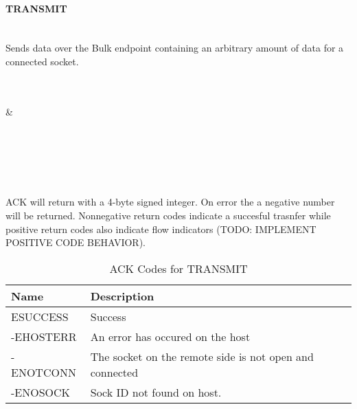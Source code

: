\documentclass[10pt]{article}
\begin{document}
	\paragraph{TRANSMIT} \mbox{}\\
	Sends data over the Bulk endpoint containing an arbitrary amount of data for a connected socket.\\
	\\
	\begin{bytefield}[bitwidth=1.7em]{32}
		 \\
			 &
			 \\
			 \\
			 \\
			 \\
	\end{bytefield}\\
	\\
	ACK will return with a 4-byte signed integer. On error the a negative number will be returned. Nonnegative return codes indicate a succesful trasnfer while positive return codes also indicate flow indicators (TODO: IMPLEMENT POSITIVE CODE BEHAVIOR).\\
	\begin{table}[H]
		\begin{center}
			\caption{ACK Codes for TRANSMIT}
			\label{tab:transmitErrTable}
			\begin{tabular}{l|l} 
				\rowcolor{lightgray}
				\textbf{Name} & \textbf{Description}\\
				\hline
				ESUCCESS & Success\\
				-EHOSTERR & An error has occured on the host\\
				-ENOTCONN & The socket on the remote side is not open and connected\\
				-ENOSOCK & Sock ID not found on host. \\
			\end{tabular}
		\end{center}
	\end{table} \mbox{}\\
\end{document}
